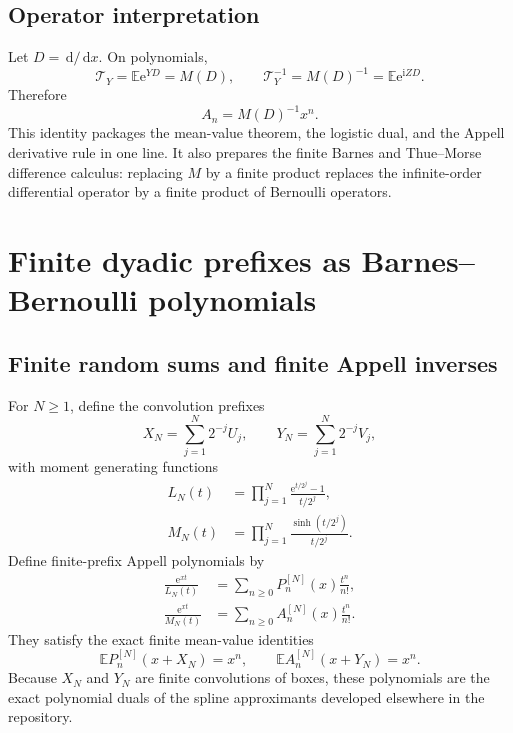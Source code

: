 \documentclass[11pt,oneside]{article}
\numberwithin{equation}{section}
\theoremstyle{definition}
\theoremstyle{remark}
\newcommand{\e}{\mathrm e}
\newcommand{\ii}{\mathrm i}
\newcommand{\dd}{\,\mathrm d}
\begin{document}
\subsection{Operator interpretation}

Let $D=\dd/\dd x$.  On polynomials,
\begin{equation}
 \mathcal T_Y=\mathbb E\e^{YD}=M(D),
 \qquad
 \mathcal T_Y^{-1}=M(D)^{-1}=\mathbb E\e^{\ii ZD}.
 \label{p2:eq:operator-deconvolution}
\end{equation}
Therefore
\begin{equation}
 A_n=M(D)^{-1}x^n.
 \label{p2:eq:A-operator}
\end{equation}
This identity packages the mean-value theorem, the logistic dual, and the Appell derivative rule in
one line.  It also prepares the finite Barnes and Thue--Morse difference calculus: replacing $M$ by
a finite product replaces the infinite-order differential operator by a finite product of Bernoulli
operators.

\section{Finite dyadic prefixes as Barnes--Bernoulli polynomials}
\label{p2:sec:barnes}

\subsection{Finite random sums and finite Appell inverses}

For $N\ge1$, define the convolution prefixes
\begin{equation}
 X_N=\sum_{j=1}^{N}2^{-j}U_j,
 \qquad
 Y_N=\sum_{j=1}^{N}2^{-j}V_j,
 \label{p2:eq:finite-XY}
\end{equation}
with moment generating functions
\begin{align}
 L_N(t)&=\prod_{j=1}^{N}\frac{\e^{t/2^j}-1}{t/2^j},
 \label{p2:eq:LN}\\
 M_N(t)&=\prod_{j=1}^{N}\frac{\sinh(t/2^j)}{t/2^j}.
 \label{p2:eq:MN}
\end{align}
Define finite-prefix Appell polynomials by
\begin{align}
 \frac{\e^{xt}}{L_N(t)}
 &=\sum_{n\ge0}P_n^{[N]}(x)\frac{t^n}{n!},
 \label{p2:eq:PN-generating}\\
 \frac{\e^{xt}}{M_N(t)}
 &=\sum_{n\ge0}A_n^{[N]}(x)\frac{t^n}{n!}.
 \label{p2:eq:AN-generating}
\end{align}
They satisfy the exact finite mean-value identities
\begin{equation}
 \mathbb E P_n^{[N]}(x+X_N)=x^n,
 \qquad
 \mathbb E A_n^{[N]}(x+Y_N)=x^n.
 \label{p2:eq:finite-mean-value}
\end{equation}
Because $X_N$ and $Y_N$ are finite convolutions of boxes, these polynomials are the exact
polynomial duals of the spline approximants developed elsewhere in the repository.
\end{document}
